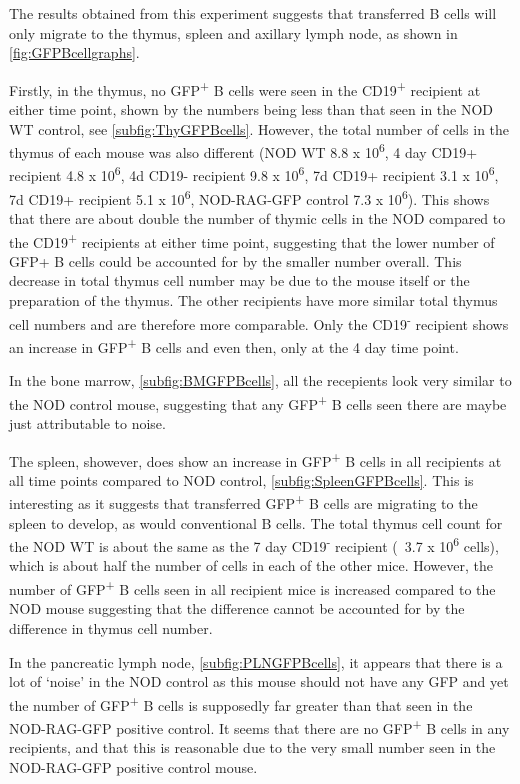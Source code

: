 The results obtained from this experiment suggests that transferred B cells will only migrate to the thymus, spleen and axillary lymph node, as shown in \cref{fig:GFPBcellgraphs}.

Firstly, in the thymus, no GFP\textsuperscript{+} B cells were seen in the CD19\textsuperscript{+} recipient at either time point, shown by the numbers being less than that seen in the NOD WT control, see \cref{subfig:ThyGFPBcells}.
However, the total number of cells in the thymus of each mouse was also different (NOD WT 8.8 x 10\textsuperscript{6}, 4 day CD19+ recipient 4.8 x 10\textsuperscript{6}, 4d CD19- recipient 9.8 x 10\textsuperscript{6}, 7d CD19+ recipient 3.1 x 10\textsuperscript{6}, 7d CD19+ recipient 5.1 x 10\textsuperscript{6}, NOD-RAG-GFP control 7.3 x 10\textsuperscript{6}).
This shows that there are about double the number of thymic cells in the NOD compared to the CD19\textsuperscript{+} recipients at either time point, suggesting that the lower number of GFP+ B cells could be accounted for by the smaller number overall.
This decrease in total thymus cell number may be due to the mouse itself or the preparation of the thymus.
The other recipients have more similar total thymus cell numbers and are therefore more comparable.
Only the CD19\textsuperscript{-} recipient shows an increase in GFP\textsuperscript{+} B cells and even then, only at the 4 day time point.

In the bone marrow, \cref{subfig:BMGFPBcells}, all the recepients look very similar to the NOD control mouse, suggesting that any GFP\textsuperscript{+} B cells seen there are maybe just attributable to noise.

The spleen, showever, does show an increase in GFP\textsuperscript{+} B cells in all recipients at all time points compared to NOD control, \cref{subfig:SpleenGFPBcells}. 
This is interesting as it suggests that transferred GFP\textsuperscript{+} B cells are migrating to the spleen to develop, as would conventional B cells.
The total thymus cell count for the NOD WT is about the same as the 7 day CD19\textsuperscript{-} recipient (~3.7 x 10\textsuperscript{6} cells), which is about half the number of cells in each of the other mice.
However, the number of GFP\textsuperscript{+} B cells seen in all recipient mice is increased compared to the NOD mouse suggesting that the difference cannot be accounted for by the difference in thymus cell number.

In the pancreatic lymph node, \cref{subfig:PLNGFPBcells}, it appears that there is a lot of `noise' in the NOD control as this mouse should not have any GFP and yet the number of GFP\textsuperscript{+} B cells is supposedly far greater than that seen in the NOD-RAG-GFP positive control. 
It seems that there are no GFP\textsuperscript{+} B cells in any recipients, and that this is reasonable due to the very small number seen in the NOD-RAG-GFP positive control mouse.

